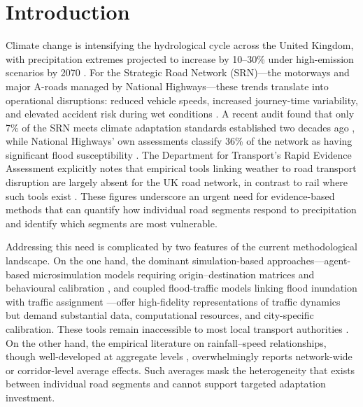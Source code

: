 \documentclass[review]{elsarticle}
\begin{document}
\section{Introduction}
\label{sec:intro}

Climate change is intensifying the hydrological cycle across the United Kingdom, with precipitation extremes projected to increase by 10--30\% under high-emission scenarios by 2070 \citep{ukcp18,stern2007contribution,koetse2009impact}. For the Strategic Road Network (SRN)---the motorways and major A-roads managed by National Highways---these trends translate into operational disruptions: reduced vehicle speeds, increased journey-time variability, and elevated accident risk during wet conditions \citep{hranac2006empirical,maze2006weather,elfaouzi2012effects}. A recent audit found that only 7\% of the SRN meets climate adaptation standards established two decades ago \citep{nce2026srn}, while National Highways' own assessments classify 36\% of the network as having significant flood susceptibility \citep{nh2024climate}. The Department for Transport's Rapid Evidence Assessment explicitly notes that empirical tools linking weather to road transport disruption are largely absent for the UK road network, in contrast to rail where such tools exist \citep{dft2024rea}. These figures underscore an urgent need for evidence-based methods that can quantify how individual road segments respond to precipitation and identify which segments are most vulnerable.

Addressing this need is complicated by two features of the current methodological landscape. On the one hand, the dominant simulation-based approaches---agent-based microsimulation models requiring origin--destination matrices and behavioural calibration \citep{huang2022overview,he2026flood}, and coupled flood-traffic models linking flood inundation with traffic assignment \citep{pregnolato2017depth,pregnolato2016impact,farahmand2024integrating}---offer high-fidelity representations of traffic dynamics but demand substantial data, computational resources, and city-specific calibration. These tools remain inaccessible to most local transport authorities \citep{unece2024stress}. On the other hand, the empirical literature on rainfall--speed relationships, though well-developed at aggregate levels \citep{hranac2006empirical,becker2026rainfall,bi2022weather,cai2016rainfall,koetse2009impact}, overwhelmingly reports network-wide or corridor-level average effects. Such averages mask the heterogeneity that exists between individual road segments and cannot support targeted adaptation investment.
\end{document}
